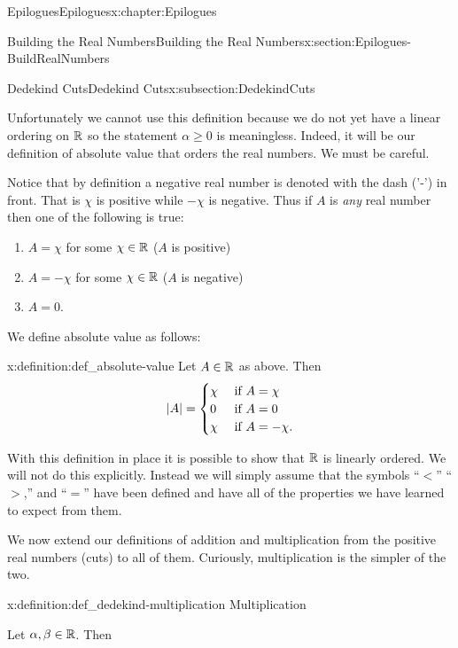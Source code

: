 \begin{chapterptx}{Epilogues}{}{Epilogues}{}{}{x:chapter:Epilogues}
\begin{sectionptx}{Building the Real Numbers}{}{Building the Real Numbers}{}{}{x:section:Epilogues-BuildRealNumbers}
\begin{subsectionptx}{Dedekind Cuts}{}{Dedekind Cuts}{}{}{x:subsection:DedekindCuts}
			\par
			Unfortunately we cannot use this definition because we do not yet have a linear ordering on \(\mathbb {R}\) so the statement \(\alpha\ge0\) is meaningless. Indeed, it will be our definition of absolute value that orders the real numbers. We must be careful.%
			\par
			Notice that by definition a negative real number is denoted with the dash ('-') in front. That is \(\chi\) is positive while \(-\chi\) is negative. Thus if \(A\) is \emph{any} real number then one of the following is true:%
			\begin{enumerate}
				\item{}\(A=\chi\) for some \(\chi\in\mathbb {R}\) (\(A\) is positive)%
				\item{}\(A=-\chi\) for some \(\chi\in\mathbb {R}\) (\(A\) is negative)%
				\item{}\(A=0\).%
			\end{enumerate}
			\par
			We define absolute value as follows:%
			\begin{definition}{}{x:definition:def_absolute-value}%
				 Let \(A\in\mathbb {R}\) as above. Then%
				\begin{equation*}
					\left|A\right|= \begin{cases}\chi &  \text{ if \(A=\chi{}\)} \\ 0 &  \text{ if \(A=0\) } \\ \chi &  \text{ if \(A=-\chi{}.\)} {} \end{cases}
				\end{equation*}
			\end{definition}
			With this definition in place it is possible to show that \(\mathbb {R}\) is linearly ordered. We will not do this explicitly. Instead we will simply assume that the symbols ``\(\lt\)'' ``\(>\),'' and ``\(=\)'' have been defined and have all of the properties we have learned to expect from them.%
			\par
			We now extend our definitions of addition and multiplication from the positive real numbers (cuts) to all of them. Curiously, multiplication is the simpler of the two.%
			\begin{definition}{}{x:definition:def_dedekind-multiplication}%
				\alert{Multiplication}%
				\par
				 Let \(\alpha, \beta\in\mathbb {R}\). Then%
				\begin{equation*}

\end{equation*}
\end{definition}
\end{subsectionptx}
\end{sectionptx}
\end{chapterptx}
